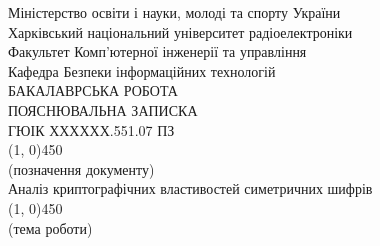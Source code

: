 %
%

\begin{titlepage}
    \begin{center}
        Міністерство освіти і науки, молоді та спорту України \\[1ex]
        Харківський національний університет радіоелектроніки \\[1ex]
        Факультет Комп'ютерної інженерії та управління \\[1ex]
        Кафедра Безпеки інформаційних технологій \\[2ex]
        \MakeUppercase{Бакалаврська робота} \\[4ex]
        \MakeUppercase{Пояснювальна записка} \\[1ex]


        \MakeUppercase{ГЮІК ХХХХХХ.551.07 ПЗ} \\[-2ex]
        \line(1, 0){450} \\[-2ex]
        {\scriptsize (позначення документу)} \\[2ex]

        Аналіз криптографічних властивостей симетричних шифрів \\[-2ex]
        \line(1, 0){450} \\[-2ex]
        {\scriptsize (тема роботи)} \\[2ex]


\end{center}
\end{titlepage}
